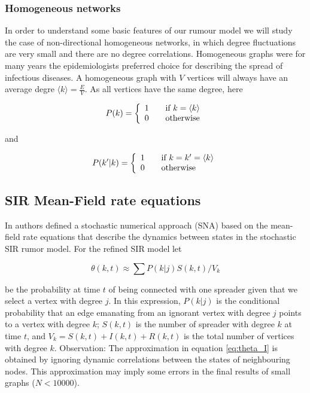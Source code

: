 \subsubsection{Homogeneous networks}

In order to understand some basic features of our rumour model we will study the case of non-directional homogeneous networks, in which degree fluctuations are very small and there are no degree correlations. Homogeneous graphs were for many years the epidemiologists preferred choice for describing the spread of infectious diseases. A homogeneous graph with $V$ vertices will always have an average degre $\langle k\rangle=\frac{E}{V}$. As all vertices have the same degree, here

\[ P(k) = \left\{ 
  \begin{array}{l l}
    1 & \quad \text{if $k=\langle k\rangle$}\\
    0 & \quad \text{otherwise}
  \end{array} \right.\]

and 

\[ P(k'|k) = \left\{ 
  \begin{array}{l l}
    1 & \quad \text{if $k=k'=\langle k\rangle$}\\
    0 & \quad \text{otherwise}
  \end{array} \right.\]


\subsection{SIR Mean-Field rate equations}
\label{sec:mean-field}

In \cite{moreno2004dynamics} authors defined a stochastic numerical approach (SNA) based on the mean-field rate equations that describe the dynamics between states in the stochastic SIR rumor model. For the refined SIR model let

\begin{equation}
\label{eq:theta_I}
\theta(k,t)\approx\sum{P(k|j)S(k,t)/V_{k}}
\end{equation}

be the probability at time $t$ of being connected with one spreader given that we select a vertex with degree $j$. In this expression, $P(k|j)$ is the conditional probability that an edge emanating from an ignorant vertex with degree $j$ points to a vertex with degree $k$; $S(k,t)$ is the number of spreader with degree $k$ at time $t$, and $V_{k}=S(k,t)+I(k,t)+R(k,t)$ is the total number of vertices with degree $k$. Observation: The approximation in equation \ref{eq:theta_I} is obtained by ignoring dynamic correlations between the states of neighbouring nodes. This approximation may imply some errors in the final results of small graphs ($N<10000$).

